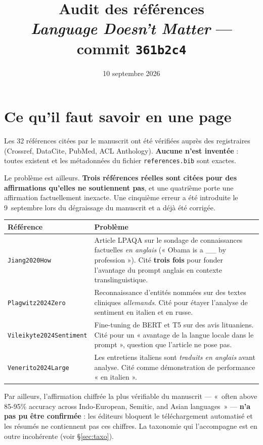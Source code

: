 \documentclass[11pt,a4paper]{article}
\title{\vspace{-1.5cm}\textbf{Audit des références}\\[2mm]
\large \textit{Language Doesn't Matter} --- commit \texttt{361b2c4}}
\author{}
\date{10 septembre 2026}
\newcommand{\cle}[1]{\texttt{\small #1}}
\begin{document}
\maketitle
\thispagestyle{fancy}
\vspace{-1cm}

\section*{Ce qu'il faut savoir en une page}

Les 32 références citées par le manuscrit ont été vérifiées auprès des
registraires (Crossref, DataCite, PubMed, ACL Anthology). \textbf{Aucune n'est
inventée} : toutes existent et les métadonnées du fichier \cle{references.bib}
sont exactes.

Le problème est ailleurs. \textbf{Trois références réelles sont citées pour des
affirmations qu'elles ne soutiennent pas}, et une quatrième porte une
affirmation factuellement inexacte. Une cinquième erreur a été introduite le
9~septembre lors du dégraissage du manuscrit et a déjà été corrigée.

\begin{center}
\begin{tabular}{@{}p{3.6cm}p{11.5cm}@{}}
\toprule
\textbf{Référence} & \textbf{Problème} \\
\midrule
\cle{Jiang2020How} &
Article LPAQA sur le sondage de connaissances factuelles \emph{en anglais}
(« Obama is a \_\_ by profession »). Cité \textbf{trois fois} pour fonder
l'avantage du prompt anglais en contexte translinguistique. \\[2mm]
\cle{Plagwitz2024Zero} &
Reconnaissance d'entités nommées sur des textes cliniques \emph{allemands}.
Cité pour étayer l'analyse de sentiment en italien et en russe. \\[2mm]
\cle{Vileikyte2024Sentiment} &
Fine-tuning de BERT et T5 sur des avis lituaniens. Cité pour un « avantage de
la langue locale dans le prompt », question que l'article ne pose pas. \\[2mm]
\cle{Venerito2024Large} &
Les entretiens italiens sont \emph{traduits en anglais} avant analyse. Cité
comme démonstration de performance « en italien ». \\
\bottomrule
\end{tabular}
\end{center}

\vspace{3mm}
Par ailleurs, l'affirmation chiffrée la plus vérifiable du manuscrit --- «~often
above 85-95\% accuracy across Indo-European, Semitic, and Asian languages~» ---
\textbf{n'a pas pu être confirmée} : les éditeurs bloquent le téléchargement
automatisé et les résumés ne contiennent pas ces chiffres. La taxonomie qui
l'accompagne est en outre incohérente (voir §\ref{sec:taxo}).
\end{document}
